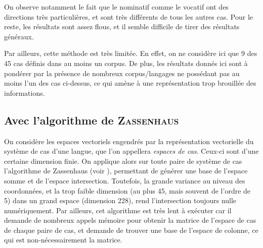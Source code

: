 \documentclass{cours}
\begin{document}
\begin{table}
	\renewcommand{\arraystretch}{1.1}
        \centering
	\label{tab:angle_voc}
\end{table}


On observe notamment le fait que le nominatif comme le vocatif ont des directions très particulières, et sont très différents de tous les autres cas. Pour le reste, les résultats sont assez flous, et il semble difficile de tirer des résultats généraux.

\medskip
Par ailleurs, cette méthode est très limitée. En effet, on ne considère ici que 9 des 45 cas définis dans au moins un corpus.
De plus, les résultats donnés ici sont à pondérer par la présence de nombreux corpus/langages ne possédant pas au moins l'un des cas ci-dessus, ce qui amène à une représentation trop brouillée des informations.


\subsection{Avec l'algorithme de \textsc{Zassenhaus}}\label{subsec:zassenhaus}
On considère les espaces vectoriels engendrés par la représentation vectorielle du système de cas d'une langue, que l'on appellera \emph{espaces de cas}.
Ceux-ci sont d'une certaine dimension finie.
On applique alors sur toute paire de système de cas l'algorithme de Zassenhaus (voir \cite{zassenhaus}), permettant de générer une base de l'espace somme et de l'espace intersection.
Toutefois, la grande variance au niveau des coordonnées, et la trop faible dimension (au plus 45, mais souvent de l'ordre de 5) dans un grand espace (dimension 228), rend l'intersection toujours nulle numériquement.
Par ailleurs, cet algorithme est très lent à exécuter car il demande de nombreux appels mémoire pour obtenir la matrice de l'espace de cas de chaque paire de cas, et demande de trouver une base de l'espace de colonne, ce qui est non-nécessairement la matrice.
\end{document}
